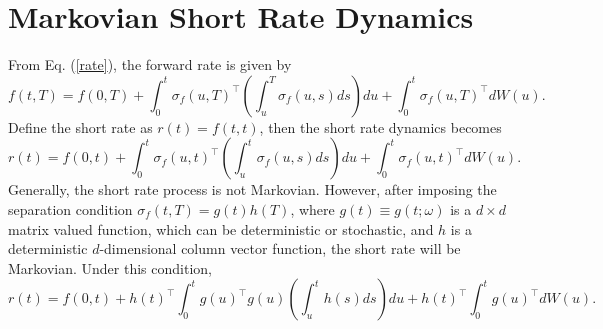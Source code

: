 \documentclass[12pt]{article}
\begin{document}
\section{Markovian Short Rate Dynamics}

  From Eq. (\ref{rate}), the forward rate is given by
  \begin{equation}
    f(t,T)=f(0,T)+\int_0^t\sigma_f(u,T)^{\top}\left(\int_u^T\sigma_f(u,s)ds\right)du+\int_0^t\sigma_f(u,T)^{\top}dW(u).
  \end{equation}
  Define the short rate as $r(t)=f(t,t)$, then the short rate dynamics becomes
  \begin{equation}
    r(t)=f(0,t)+\int_0^t\sigma_f(u,t)^{\top}\left(\int_u^t\sigma_f(u,s)ds\right)du+\int_0^t\sigma_f(u,t)^{\top}dW(u).
  \end{equation}
  Generally, the short rate process is not Markovian. However, after imposing the separation condition
  $\sigma_f(t,T)=g(t)h(T)$, where $g(t)\equiv g(t;\omega)$ is a $d\times d$ matrix valued function, which can
  be deterministic or stochastic, and $h$ is a
  deterministic $d$-dimensional column vector function, the short rate will be Markovian. Under this condition,
  \begin{equation}
    r(t)=f(0,t)+h(t)^{\top}\int_0^tg(u)^{\top}g(u)\left(\int_u^th(s)ds\right)du+h(t)^{\top}\int_0^tg(u)^{\top}dW(u).
  \end{equation}
\end{document}

